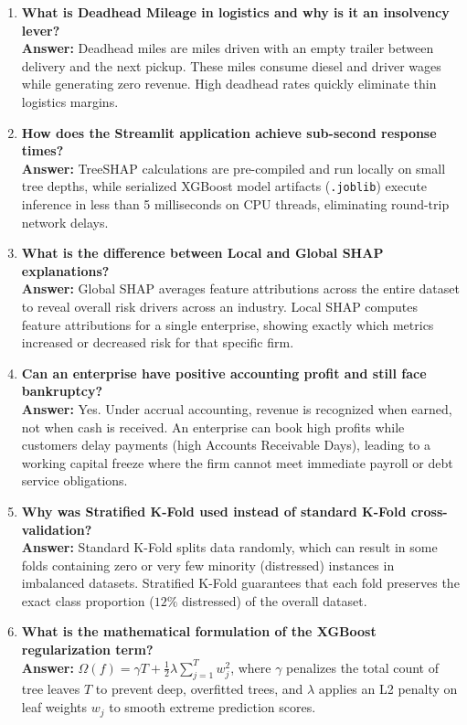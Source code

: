 \documentclass[11pt, a4paper]{article}
\begin{document}
\begin{enumerate}
    \item \textbf{What is Deadhead Mileage in logistics and why is it an insolvency lever?}\\
    \textbf{Answer:} Deadhead miles are miles driven with an empty trailer between delivery and the next pickup. These miles consume diesel and driver wages while generating zero revenue. High deadhead rates quickly eliminate thin logistics margins.
    
    \item \textbf{How does the Streamlit application achieve sub-second response times?}\\
    \textbf{Answer:} TreeSHAP calculations are pre-compiled and run locally on small tree depths, while serialized XGBoost model artifacts (\texttt{.joblib}) execute inference in less than 5 milliseconds on CPU threads, eliminating round-trip network delays.
    
    \item \textbf{What is the difference between Local and Global SHAP explanations?}\\
    \textbf{Answer:} Global SHAP averages feature attributions across the entire dataset to reveal overall risk drivers across an industry. Local SHAP computes feature attributions for a single enterprise, showing exactly which metrics increased or decreased risk for that specific firm.
    
    \item \textbf{Can an enterprise have positive accounting profit and still face bankruptcy?}\\
    \textbf{Answer:} Yes. Under accrual accounting, revenue is recognized when earned, not when cash is received. An enterprise can book high profits while customers delay payments (high Accounts Receivable Days), leading to a working capital freeze where the firm cannot meet immediate payroll or debt service obligations.
    
    \item \textbf{Why was Stratified K-Fold used instead of standard K-Fold cross-validation?}\\
    \textbf{Answer:} Standard K-Fold splits data randomly, which can result in some folds containing zero or very few minority (distressed) instances in imbalanced datasets. Stratified K-Fold guarantees that each fold preserves the exact class proportion ($12\%$ distressed) of the overall dataset.
    
    \item \textbf{What is the mathematical formulation of the XGBoost regularization term?}\\
    \textbf{Answer:} $\Omega(f) = \gamma T + \frac{1}{2}\lambda \sum_{j=1}^T w_j^2$, where $\gamma$ penalizes the total count of tree leaves $T$ to prevent deep, overfitted trees, and $\lambda$ applies an L2 penalty on leaf weights $w_j$ to smooth extreme prediction scores.
    

\end{enumerate}
\end{document}
